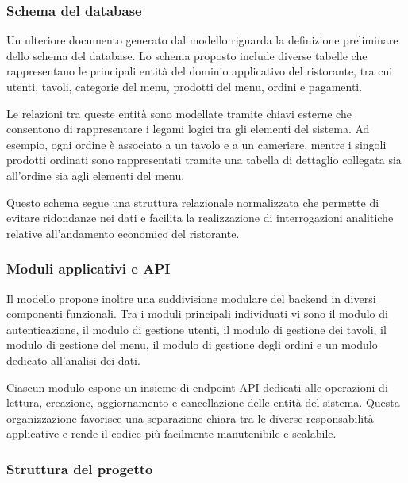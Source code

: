 \subsubsection{Schema del database}

Un ulteriore documento generato dal modello riguarda la definizione preliminare dello schema del database. Lo schema proposto include diverse tabelle che rappresentano le principali entità del dominio applicativo del ristorante, tra cui utenti, tavoli, categorie del menu, prodotti del menu, ordini e pagamenti.

Le relazioni tra queste entità sono modellate tramite chiavi esterne che consentono di rappresentare i legami logici tra gli elementi del sistema. Ad esempio, ogni ordine è associato a un tavolo e a un cameriere, mentre i singoli prodotti ordinati sono rappresentati tramite una tabella di dettaglio collegata sia all'ordine sia agli elementi del menu.

Questo schema segue una struttura relazionale normalizzata che permette di evitare ridondanze nei dati e facilita la realizzazione di interrogazioni analitiche relative all'andamento economico del ristorante.

\subsubsection{Moduli applicativi e API}

Il modello propone inoltre una suddivisione modulare del backend in diversi componenti funzionali. Tra i moduli principali individuati vi sono il modulo di autenticazione, il modulo di gestione utenti, il modulo di gestione dei tavoli, il modulo di gestione del menu, il modulo di gestione degli ordini e un modulo dedicato all'analisi dei dati.

Ciascun modulo espone un insieme di endpoint API dedicati alle operazioni di lettura, creazione, aggiornamento e cancellazione delle entità del sistema. Questa organizzazione favorisce una separazione chiara tra le diverse responsabilità applicative e rende il codice più facilmente manutenibile e scalabile.

\subsubsection{Struttura del progetto}

